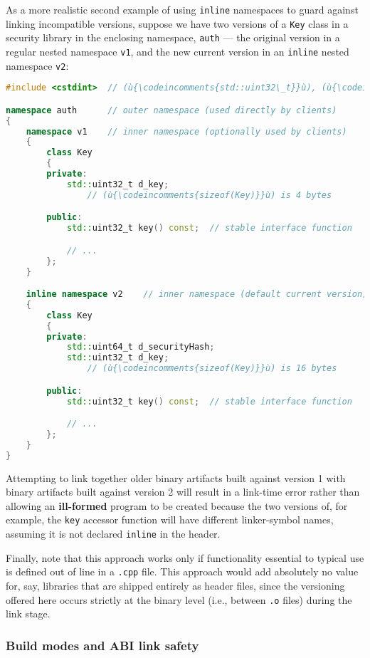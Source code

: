 As a more realistic second example of using \texttt{inline} namespaces
to guard against linking incompatible versions, suppose we have two
versions of a \texttt{Key} class in a security library in the enclosing
namespace, \texttt{auth} --- the original version in a regular nested
namespace \texttt{v1}, and the new current version in an \texttt{inline}
nested namespace \texttt{v2}:

\begin{lstlisting}[language=C++]
#include <cstdint>  // (ù{\codeincomments{std::uint32\_t}}ù), (ù{\codeincomments{std::uint64\_t}}ù)

namespace auth      // outer namespace (used directly by clients)
{
    namespace v1    // inner namespace (optionally used by clients)
    {
        class Key
        {
        private:
            std::uint32_t d_key;
                // (ù{\codeincomments{sizeof(Key)}}ù) is 4 bytes

        public:
            std::uint32_t key() const;  // stable interface function

            // ...
        };
    }

    inline namespace v2    // inner namespace (default current version)
    {
        class Key
        {
        private:
            std::uint64_t d_securityHash;
            std::uint32_t d_key;
                // (ù{\codeincomments{sizeof(Key)}}ù) is 16 bytes

        public:
            std::uint32_t key() const;  // stable interface function

            // ...
        };
    }
}
\end{lstlisting}

\noindent Attempting to link together older binary artifacts built against version
1 with binary artifacts built against version 2 will result in a
link-time error rather than allowing an \textbf{ill-formed} program to
be created because the two versions of, for example, the \texttt{key}
accessor function will have different linker-symbol names, assuming it
is not declared \texttt{inline} in the header.

Finally, note that this approach works only if functionality essential
to typical use is defined out of line in a \texttt{.cpp} file. This
approach would add absolutely no value for, say, libraries that are
shipped entirely as header files, since the versioning offered here
occurs strictly at the binary level (i.e., between \texttt{.o} files)
during the link stage.

\subsubsection[Build modes and ABI link safety]{Build modes and ABI link safety}\label{build-modes-and-abi-link-safety}

